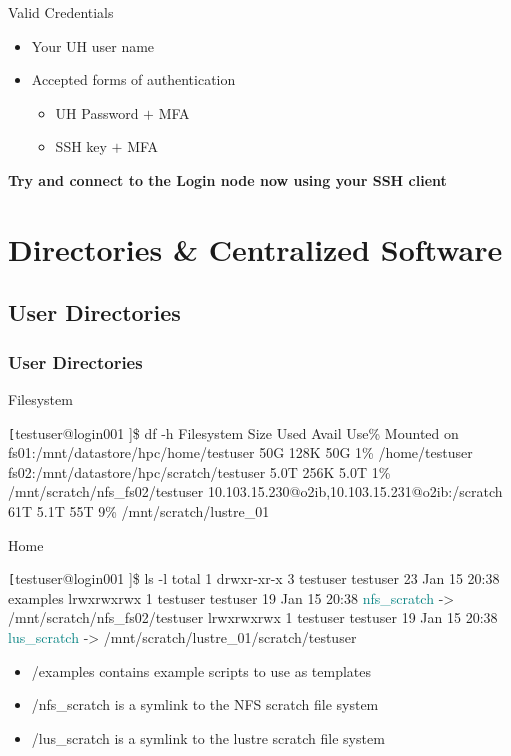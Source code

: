 \begin{frame}
\begin{block}{Valid Credentials}
\begin{itemize}
			\item Your UH user name
			\item Accepted forms of authentication
			\begin{itemize}\scriptsize
				\item UH Password $+$ MFA 
				\item SSH key $+$ MFA
			\end{itemize}
		\end{itemize}
	\end{block}
	\begin{center}\scriptsize
	\textbf{\large Try and connect to the {\mana} Login node now using your SSH client}
	\end{center}
\end{frame}

 
\section[Directories \& Centralized Software]{Directories \& Centralized Software }
\subsection{User Directories}
\begin{frame}[fragile]
\frametitle{User Directories}
\begin{block}{Filesystem}
\begin{semiverbatim}\tiny \texttt
[testuser@login001 \ctilde]\$ df -h
Filesystem                                       Size  Used Avail Use\%  Mounted on
fs01:/mnt/datastore/hpc/home/testuser             50G  128K   50G   1\%  /home/testuser
fs02:/mnt/datastore/hpc/scratch/testuser         5.0T  256K  5.0T   1\%  /mnt/scratch/nfs_fs02/testuser
10.103.15.230@o2ib,10.103.15.231@o2ib:/scratch    61T  5.1T  55T   9\%   /mnt/scratch/lustre_01
\end{semiverbatim}
\end{block}
\begin{block}{Home}
\begin{semiverbatim}\tiny \texttt
[testuser@login001 \ctilde]\$ ls -l 
total 1
drwxr-xr-x 3 testuser testuser 23 Jan 15 20:38 examples
lrwxrwxrwx 1 testuser testuser 19 Jan 15 20:38 \textcolor{teal}{nfs_scratch} -> /mnt/scratch/nfs_fs02/testuser
lrwxrwxrwx 1 testuser testuser 19 Jan 15 20:38 \textcolor{teal}{lus_scratch} -> /mnt/scratch/lustre_01/scratch/testuser
\end{semiverbatim}
\end{block}
\begin{itemize}
		\item \ctilde{}/examples contains example scripts to use as templates
		\item \ctilde{}/nfs\_scratch is a symlink to the NFS scratch file system
		\item \ctilde{}/lus\_scratch is a symlink to the lustre scratch file system
\end{itemize}
\end{frame}


